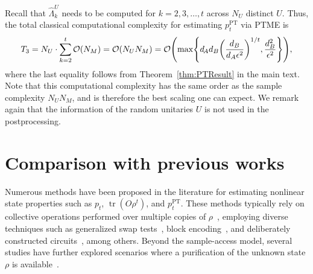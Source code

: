 \documentclass[aps,prl,twocolumn,nofootinbib,superscriptaddress,10pt]{revtex4-2}
\let\originalleft\left
\let\originalright\right
\renewcommand{\left}{\mathopen{}\mathclose\bgroup\originalleft}
\renewcommand{\right}{\aftergroup\egroup\originalright}
\DeclareMathOperator{\Tr}{tr}
\newcommand{\bigo}[1]{\mathcal{O}\left(#1\right)}
\theoremstyle{plain}
\theoremstyle{definition}
\newcommand{\PT}{\mathrm{PT}}
\newcommand{\tref}[1]{Theorem~\ref{#1}}
\begin{document}
Recall that $\hat{\Lambda}_k^U$ needs to be computed for
$k=2,3,\dots,t$ across $N_U$ distinct $U$.
Thus, the total classical computational complexity for estimating
$p_t^{\PT}$ via PTME is
\begin{equation}
T_3=
N_U\cdot\sum_{k=2}^{t}\bigo{N_M}
=\bigo{N_U N_M}
=\bigo{ \max\left\lbrace d_{\!A} d_B \left( \frac{d_B}{d_{A}\epsilon^2} \right)^{1/t}, \frac{d_B^2}{\epsilon^2}  \right\rbrace },
\end{equation}
where the last equality follows from \tref{thm:PTResult} in the main text. 
Note that this computational complexity has the same order as the sample complexity $N_U N_M$, and is therefore the best scaling one can expect.
We remark again that the information of the random unitaries $U$ is not used in the postprocessing. 



\section{Comparison with previous works}
\label{sec:comparison}

Numerous methods have been proposed in the literature for estimating nonlinear state properties such as $p_t$, $\Tr(O\rho^t)$, and $p_t^{\PT}$. These methods typically rely on collective operations performed over multiple copies of $\rho$~\cite{Quek2024multivariatetrace,liu2025estimating,Shin2025resourceefficient,shi2025near,subacsi2019entanglement,zhou2024hybrid,liu2024auxiliary,chen2025simultaneous,shi2025near,ye2025exponential,PhysRevLett.88.217901,bruni2004measurimg,zhang2025measuring,PhysRevLett.121.150503,PhysRevLett.94.040502,PhysRevA.99.062309,PhysRevLett.129.260501}, employing diverse techniques such as generalized swap tests~\cite{zhou2024hybrid,PhysRevLett.88.217901,bruni2004measurimg,PhysRevLett.94.040502,PhysRevA.99.062309}, block encoding~\cite{liu2025estimating,zhang2025measuring}, and deliberately constructed circuits~\cite{Quek2024multivariatetrace,liu2024auxiliary}, among others.
Beyond the sample-access model, several studies have further explored scenarios where a purification of the unknown state $\rho$ is available~\cite{liu2024exponential,zhang2025measuring,chen2025simultaneous}.
\end{document}
